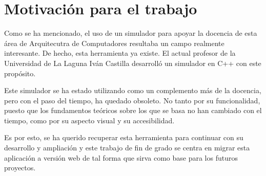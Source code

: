 \section{Motivación para el trabajo}
\label{1:sec:3}

Como se ha mencionado, el uso de un simulador para apoyar la docencia de esta área
de Arquitecutra de Computadores resultaba un campo realmente interesante. De hecho,
esta herramienta ya existe. El actual profesor de la Universidad de La Laguna 
Iván Castilla desarrolló un simulador en C++ con este propósito.

\bigskip
Este simulador se ha estado utilizando como un complemento más de la docencia, pero
con el paso del tiempo, ha quedado obsoleto. No tanto por su funcionalidad, puesto
que los fundamentos teóricos sobre los que se basa no han cambiado con el tiempo, como 
por su aspecto visual y su accesibilidad.

\bigskip
Es por esto, se ha querido recuperar esta herramienta para continuar con su desarrollo 
y ampliación y este trabajo de fin de grado se centra en migrar esta aplicación a versión 
web de tal forma que sirva como base para los futuros proyectos.

